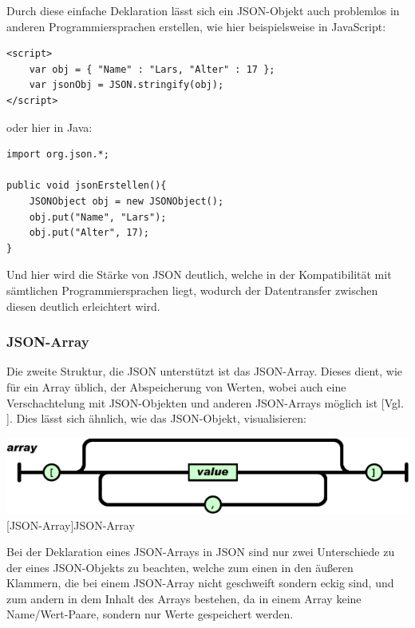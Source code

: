\documentclass[12pt,a4paper,bibliography=totocnumbered,listof=totocnumbered]{scrartcl}
\begin{document}
\begin{minipage}{\linewidth}
Durch diese einfache Deklaration lässt sich ein JSON-Objekt auch problemlos in anderen Programmiersprachen erstellen, wie hier beispielsweise in JavaScript:
\\
\vspace{1em}
\begin{lstlisting}[caption=JSON-Objekt in JavaScript, label=lst:json-objekt1]
<script>
	var obj = { "Name" : "Lars, "Alter" : 17 };
	var jsonObj = JSON.stringify(obj);
</script>
\end{lstlisting}

oder hier in Java:
\\
\vspace{1em}
\begin{lstlisting}[caption=JSON-Objekt in Java, label=lst:json-objekt2]
import org.json.*;

public void jsonErstellen(){
	JSONObject obj = new JSONObject();
	obj.put("Name", "Lars");
	obj.put("Alter", 17);
}
\end{lstlisting}

Und hier wird die Stärke von JSON deutlich, welche in der Kompatibilität mit sämtlichen Programmiersprachen liegt, wodurch der Datentransfer zwischen diesen deutlich erleichtert wird.

\subsubsection{JSON-Array}
\label{sec:JSON-Array}
Die zweite Struktur, die JSON unterstützt ist das JSON-Array.
Dieses dient, wie für ein Array üblich, der Abspeicherung von Werten, wobei auch eine Verschachtelung mit JSON-Objekten und anderen JSON-Arrays möglich ist [Vgl. \cite{json}].
Dies lässt sich ähnlich, wie das JSON-Objekt, visualisieren:

\vspace{1em}
\begin{minipage}{\linewidth}
	\centering
	\includegraphics[width=0.9\linewidth]{Bilder/json-array.png}
	[JSON-Array]{JSON-Array\footnotemark }
	\label{fig:json-array}
\end{minipage}

Bei der Deklaration eines JSON-Arrays in JSON sind nur zwei Unterschiede zu der eines JSON-Objekts zu beachten, welche zum einen in den äußeren Klammern, die bei einem JSON-Array nicht geschweift sondern eckig sind, und zum andern in dem Inhalt des Arrays bestehen, da in einem Array keine Name/Wert-Paare, sondern nur Werte gespeichert werden.


\end{minipage}
\end{document}
